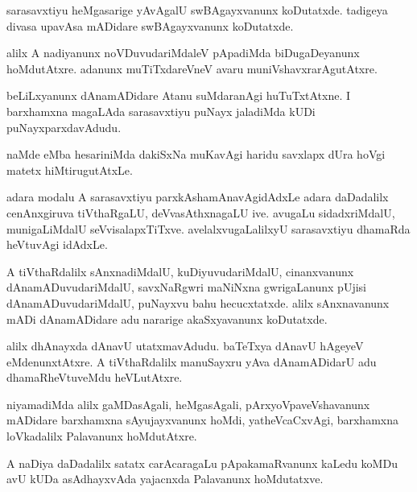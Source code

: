 \documentclass{article}
\begin{document}
\begin{mn}
sarasavxtiyu  heMgasarige  yAvAgalU  swBAgayxvanunx  koDutatxde.  
tadigeya  divasa  upavAsa mADidare  swBAgayxvanunx  koDutatxde.
\end{mn}

\begin{mn}
alilx  A  nadiyanunx  noVDuvudariMdaleV  pApadiMda  biDugaDeyanunx  
hoMdutAtxre.  adanunx  muTiTxdareVneV  avaru  muniVshavxrarAgutAtxre. 
\end{mn}

\begin{mn}
beLiLxyanunx  dAnamADidare  Atanu  suMdaranAgi  huTuTxtAtxne.  I barxhamxna  
magaLAda  sarasavxtiyu  puNayx jaladiMda  kUDi  puNayxparxdavAdudu.
\end{mn}

\begin{mn}
naMde  eMba  hesariniMda  dakiSxNa  muKavAgi  haridu  savxlapx  dUra  hoVgi  
matetx  hiMtirugutAtxLe.
\end{mn}

\begin{mn}
adara  modalu  A  sarasavxtiyu  parxkAshamAnavAgidAdxLe  adara  daDadalilx  cenAnxgiruva  
tiVthaRgaLU,  deVvasAthxnagaLU  ive.  avugaLu  sidadxriMdalU,  munigaLiMdalU  seVvisalapxTiTxve.  
avelalxvugaLalilxyU  sarasavxtiyu  dhamaRda  heVtuvAgi  idAdxLe.  
\end{mn}

\begin{mn}
A tiVthaRdalilx  sAnxnadiMdalU,  kuDiyuvudariMdalU,  cinanxvanunx  dAnamADuvudariMdalU,  savxNaRgwri  
maNiNxna gwrigaLanunx  pUjisi  dAnamADuvudariMdalU,  puNayxvu  bahu  hecucxtatxde.  alilx  
sAnxnavanunx  mADi  dAnamADidare  adu  nararige  akaSxyavanunx  koDutatxde.  
\end{mn}

\begin{mn}
alilx  dhAnayxda  dAnavU  utatxmavAdudu.  baTeTxya  dAnavU  hAgeyeV  eMdenunxtAtxre.  
A  tiVthaRdalilx  manuSayxru  yAva  dAnamADidarU  adu  dhamaRheVtuveMdu  heVLutAtxre.
\end{mn}

\begin{mn}
niyamadiMda  alilx  gaMDasAgali,  heMgasAgali,  pArxyoVpaveVshavanunx  
mADidare  barxhamxna  sAyujayxvanunx  hoMdi,  yatheVcaCxvAgi,  barxhamxna  
loVkadalilx  Palavanunx  hoMdutAtxre.
\end{mn}

\begin{mn}
A naDiya  daDadalilx  satatx  carAcaragaLu  pApakamaRvanunx  kaLedu koMDu  
avU  kUDa  asAdhayxvAda  yajacnxda  Palavanunx  hoMdutatxve.
\end{mn}
\end{document}
